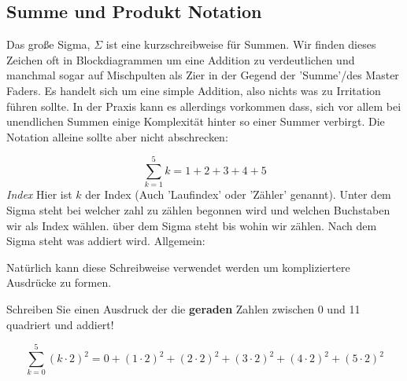 


%     

\subsection{Summe und Produkt Notation}

Das große Sigma, $\Sigma$ ist eine kurzschreibweise für Summen. Wir finden dieses Zeichen oft in Blockdiagrammen um eine Addition zu verdeutlichen und manchmal sogar auf Mischpulten als Zier in der Gegend der 'Summe'/des Master Faders. Es handelt sich um eine simple Addition, also nichts was zu Irritation führen sollte. In der Praxis kann es allerdings vorkommen dass, sich vor allem bei unendlichen Summen einige Komplexität hinter so einer Summer verbirgt. Die Notation alleine sollte aber nicht abschrecken:

\begin{equation}
{\displaystyle \sum _{k=1}^{5}k = 1 + 2 + 3 + 4 + 5 }
\end{equation}
\emph{Index}
Hier ist $k$ der Index (Auch 'Laufindex' oder 'Zähler' genannt). Unter dem Sigma steht bei welcher zahl zu zählen begonnen wird und welchen Buchstaben wir als Index wählen. über dem Sigma steht bis wohin wir zählen. Nach dem Sigma steht was addiert wird. Allgemein:



Natürlich kann diese Schreibweise verwendet werden um kompliziertere Ausdrücke zu formen.

\begin{question}
Schreiben Sie einen Ausdruck der die \textbf{geraden} Zahlen zwischen 0 und 11 quadriert und addiert!
\end{question}
\begin{answer}

$${\displaystyle \sum _{k=0}^{5} (k \cdot 2)^2 = 0 + (1 \cdot 2)^2 + (2 \cdot 2)^2 + (3 \cdot 2)^2 + (4 \cdot 2)^2 + (5 \cdot 2)^2}$$

\end{answer}




